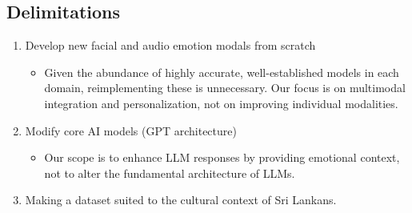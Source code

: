 \subsection{Delimitations}
\begin{enumerate}
    \item Develop new facial and audio emotion modals from scratch
        \begin{itemize}
            \item Given the abundance of highly accurate, well-established models in each domain, reimplementing these is unnecessary. Our focus is on multimodal integration and personalization, not on improving individual modalities.
        \end{itemize}
    \item Modify core AI models (GPT architecture)
        \begin{itemize}
            \item Our scope is to enhance LLM responses by providing emotional context, not to alter the fundamental architecture of LLMs.
        \end{itemize}
    \item Making a dataset suited to the cultural context of Sri Lankans.
\end{enumerate}